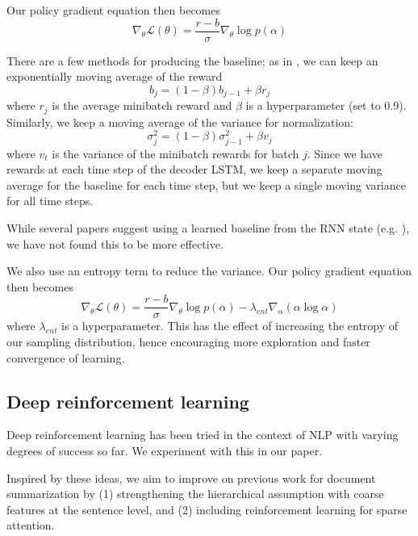 \documentclass[11pt]{report}
\begin{document}
Our policy gradient equation then becomes
\begin{equation}
\label{policygradbaseline}
\nabla_\theta \mathcal{L}(\theta) = \frac{r-b}{\sigma} \nabla_\theta \log p(\alpha)
\end{equation}

There are a few methods for producing the baseline; as in \cite{mnih2014belief}, we can keep an exponentially moving average of the reward
$$b_j = (1 - \beta) b_{j-1} + \beta r_j$$
where $r_j$ is the average minibatch reward and $\beta$ is a hyperparameter (set to 0.9).
Similarly, we keep a moving average of the variance for normalization:
$$\sigma^2_j = (1 - \beta) \sigma^2_{j-1} + \beta v_j$$
where $v_t$ is the variance of the minibatch rewards for batch $j$. Since we have rewards at each time step of the decoder LSTM, we keep a separate moving average for the baseline for each time step, but we keep a single moving variance for all time steps.

While several papers suggest using a learned baseline from the RNN state (e.g. \cite{ranzato2015}), we have not found this to be more effective.

We also use an entropy term to reduce the variance. Our policy gradient equation then becomes
\begin{equation}
\label{policygradbaselineentropy}
\nabla_\theta \mathcal{L}(\theta) = \frac{r-b}{\sigma} \nabla_\theta \log p(\alpha) - \lambda_{ent} \nabla_\alpha(\alpha \log \alpha)
\end{equation}
where $\lambda_{ent}$ is a hyperparameter. This has the effect of increasing the entropy of our sampling distribution, hence encouraging more exploration and faster convergence of learning.


\subsection{Deep reinforcement learning}

Deep reinforcement learning has been tried in the context of NLP \citep{zaremba2015rlntm, ranzato2015, li2016dialogueRL} with varying degrees of success so far. We experiment with this in our paper.



Inspired by these ideas, we aim to improve on previous work for document summarization by (1) strengthening the hierarchical assumption with coarse features at the sentence level, and (2) including reinforcement learning for sparse attention.
\end{document}

